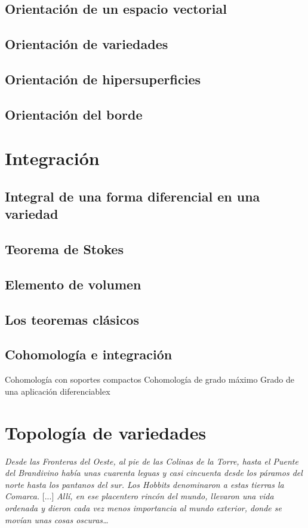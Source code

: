 \documentclass[12pt,a4paper]{book}
\theoremstyle{definition} \newtheorem{defn}[thm]{Definición}
\theoremstyle{definition} \newtheorem{ejemplo}[thm]{Ejemplo}
\theoremstyle{definition} \newtheorem{ejercicio}[thm]{Ejercicio}
\theoremstyle{remark} \newtheorem*{obs}{Observación}
\begin{document}
	  \section{Orientación de un espacio vectorial}
	  \section{Orientación de variedades}
	  \section{Orientación de hipersuperficies}
	  \section{Orientación del borde}
	  \chapter{Integración}
	  \section{Integral de una forma diferencial en una variedad}
	  \section{Teorema de Stokes}
	  \section{Elemento de volumen}
	  \section{Los teoremas clásicos}
	  \section{Cohomología e integración}
	  Cohomología con soportes compactos
	  Cohomología de grado máximo
	  Grado de una aplicación diferenciablex

	  
	  \appendix
	  \chapter{Topología de variedades}
	  \epigraph{\textit{Desde las Fronteras del Oeste, al pie de las Colinas de la Torre, hasta el Puente del Brandivino había unas cuarenta leguas y casi cincuenta desde los páramos del norte hasta los pantanos del sur. Los Hobbits denominaron a estas tierras la Comarca.} [...] \textit{Allí, en ese placentero rincón del mundo, llevaron una vida ordenada y dieron cada vez menos importancia al mundo exterior, donde se movían unas cosas oscuras\dots}}{}
\end{document}
